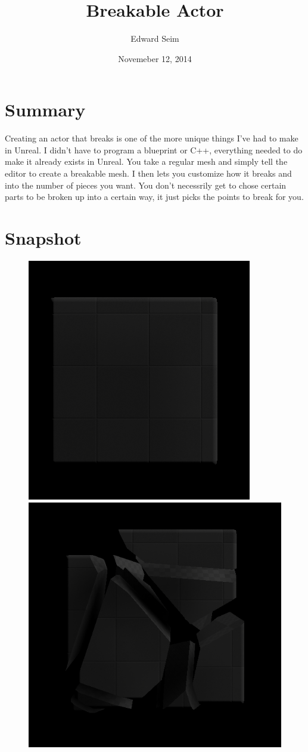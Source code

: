 \documentclass[a4paper]{article}
\title{Breakable Actor}
\author{Edward Seim}
\date{Novemeber 12, 2014}
\begin{document}
\maketitle

\section{Summary}

Creating an actor that breaks is one of the more unique things I've had to make in Unreal. I didn't have to program a blueprint or C++, everything needed to do make it already exists in Unreal. You take a regular mesh and simply tell the editor to create a breakable mesh. I then lets you customize how it breaks and into the number of pieces you want. You don't necessrily get to chose certain parts to be broken up into a certain way, it just picks the points to break for you.

\section{Snapshot}

\begin{figure}
\centering
\includegraphics[keepaspectratio=true, scale=.4]{CompleteCube.png}
\includegraphics[keepaspectratio=true, scale=.4]{BrokenCube.png}
\end{figure}
\end{document}
